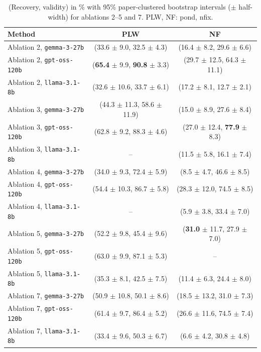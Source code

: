 \begin{table}[t]
\centering
\caption{(Recovery, validity) in \% with 95\% paper-clustered bootstrap intervals ($\pm$ half-width) for ablations 2--5 and 7. PLW, NF: pond, nfix.}
\label{tab:ablations-recovery-validity}
\begin{tabular}{lcc}
\toprule
Method & PLW & NF \\
\midrule
Ablation 2, \texttt{gemma-3-27b} & (33.6 $\pm$ 9.0, 32.5 $\pm$ 4.3) & (16.4 $\pm$ 8.2, 29.6 $\pm$ 6.6) \\
Ablation 2, \texttt{gpt-oss-120b} & (\textbf{65.4} $\pm$ 9.9, \textbf{90.8} $\pm$ 3.3) & (29.7 $\pm$ 12.5, 64.3 $\pm$ 11.1) \\
Ablation 2, \texttt{llama-3.1-8b} & (32.6 $\pm$ 10.6, 33.7 $\pm$ 6.1) & (17.2 $\pm$ 8.1, 12.7 $\pm$ 2.1) \\
\midrule
Ablation 3, \texttt{gemma-3-27b} & (44.3 $\pm$ 11.3, 58.6 $\pm$ 11.9) & (15.0 $\pm$ 8.9, 27.6 $\pm$ 8.4) \\
Ablation 3, \texttt{gpt-oss-120b} & (62.8 $\pm$ 9.2, 88.3 $\pm$ 4.6) & (27.0 $\pm$ 12.4, \textbf{77.9} $\pm$ 8.3) \\
Ablation 3, \texttt{llama-3.1-8b} & -- & (11.5 $\pm$ 5.8, 16.1 $\pm$ 7.4) \\
\midrule
Ablation 4, \texttt{gemma-3-27b} & (34.0 $\pm$ 9.3, 72.4 $\pm$ 5.9) & (8.5 $\pm$ 4.7, 46.6 $\pm$ 8.5) \\
Ablation 4, \texttt{gpt-oss-120b} & (54.4 $\pm$ 10.3, 86.7 $\pm$ 5.8) & (28.3 $\pm$ 12.0, 74.5 $\pm$ 8.5) \\
Ablation 4, \texttt{llama-3.1-8b} & -- & (5.9 $\pm$ 3.8, 33.4 $\pm$ 7.0) \\
\midrule
Ablation 5, \texttt{gemma-3-27b} & (52.2 $\pm$ 9.8, 45.4 $\pm$ 9.6) & (\textbf{31.0} $\pm$ 11.7, 27.9 $\pm$ 7.0) \\
Ablation 5, \texttt{gpt-oss-120b} & (63.0 $\pm$ 9.9, 87.1 $\pm$ 5.3) & -- \\
Ablation 5, \texttt{llama-3.1-8b} & (35.3 $\pm$ 8.1, 42.5 $\pm$ 7.5) & (11.4 $\pm$ 6.3, 24.4 $\pm$ 8.0) \\
\midrule
Ablation 7, \texttt{gemma-3-27b} & (50.9 $\pm$ 10.8, 50.1 $\pm$ 8.6) & (18.5 $\pm$ 13.2, 31.0 $\pm$ 7.3) \\
Ablation 7, \texttt{gpt-oss-120b} & (61.4 $\pm$ 9.7, 86.4 $\pm$ 5.2) & (26.6 $\pm$ 11.6, 74.5 $\pm$ 7.4) \\
Ablation 7, \texttt{llama-3.1-8b} & (33.4 $\pm$ 9.6, 50.3 $\pm$ 6.7) & (6.6 $\pm$ 4.2, 30.8 $\pm$ 4.8) \\
\bottomrule
\end{tabular}
\end{table}
